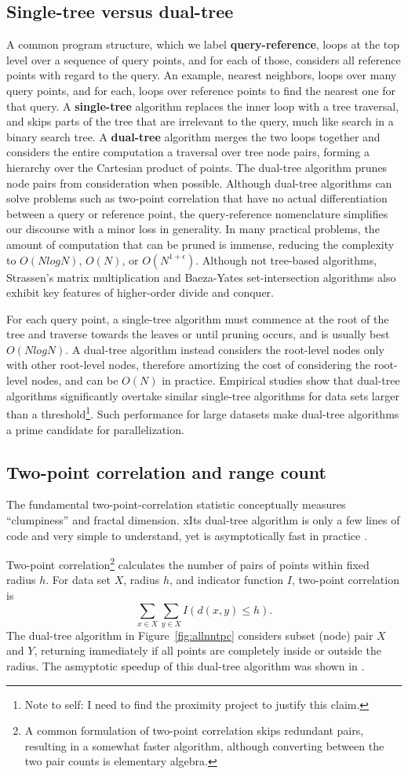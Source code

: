 \documentclass[twoside,leqno,twocolumn]{article}
\newcommand{\authornote}[1]{\footnote{Note to self: #1}}
\newcommand{\authorsnote}[1]{\authornote{#1}}
\newcommand{\fig}[1]{Figure~\ref{fig:#1}}
\newcommand{\mysub}[1]{\subsection{#1} }
\newcommand{\defterm}[1]{{\bf #1}}
\begin{document}
\mysub{Single-tree versus dual-tree}
A common program structure, which we label \defterm{query-reference}, loops at the top level over a sequence of query points, and for each of those, considers all reference points with regard to the query.
An example, nearest neighbors, loops over many query points, and for each, loops over reference points to find the nearest one for that query.
A \defterm{single-tree} algorithm replaces the inner loop with a tree traversal, and skips parts of the tree that are irrelevant to the query, much like search in a binary search tree.
A \defterm{dual-tree} algorithm merges the two loops together and considers the entire computation a traversal over tree node pairs, forming a hierarchy over the Cartesian product of points.
The dual-tree algorithm prunes node pairs from consideration when possible.
Although dual-tree algorithms can solve problems such as two-point correlation that have no actual differentiation between a query or reference point, the query-reference nomenclature simplifies our discourse with a minor loss in generality.
In many practical problems, the amount of computation that can be pruned is immense, reducing the complexity to $O(N log N)$, $O(N)$, or $O(N^{1+\epsilon})$.
Although not tree-based algorithms, Strassen's\cite{strassen} matrix multiplication and Baeza-Yates\cite{baeza_yates} set-intersection algorithms also exhibit key features of higher-order divide and conquer.

For each query point, a single-tree algorithm must commence at the root of the tree and traverse towards the leaves or until pruning occurs, and is usually best $O(N log N)$.
A dual-tree algorithm instead considers the root-level nodes only with other root-level nodes, therefore amortizing the cost of considering the root-level nodes, and can be $O(N)$ in practice.
Empirical studies show that dual-tree algorithms significantly overtake similar single-tree algorithms for data sets larger than a threshold\authorsnote{I need to find the proximity project to justify this claim.}.
Such performance for large datasets make dual-tree algorithms a prime candidate for parallelization.

\mysub{Two-point correlation and range count}
The fundamental two-point-correlation statistic conceptually measures ``clumpiness'' and fractal dimension.
xIts dual-tree algorithm is only a few lines of code and very simple to understand, yet is asymptotically fast in practice \cite{gray_nbody}.

Two-point correlation\footnote{A common formulation of two-point correlation skips redundant pairs, resulting in a somewhat faster algorithm, although converting between the two pair counts is elementary algebra.} calculates the number of pairs of points within fixed radius $h$.
For data set $X$, radius $h$, and indicator function $I$, two-point correlation is
\[\sum_{x \in X} \sum_{y \in X} I(d(x, y) \leq h).\]
\noindent
The dual-tree algorithm in \fig{allnntpc} considers subset (node) pair $X$ and $Y$, returning immediately if all points are completely inside or outside the radius.
The asmyptotic speedup of this dual-tree algorithm was shown in \cite{gray_nbody}.
\end{document}
